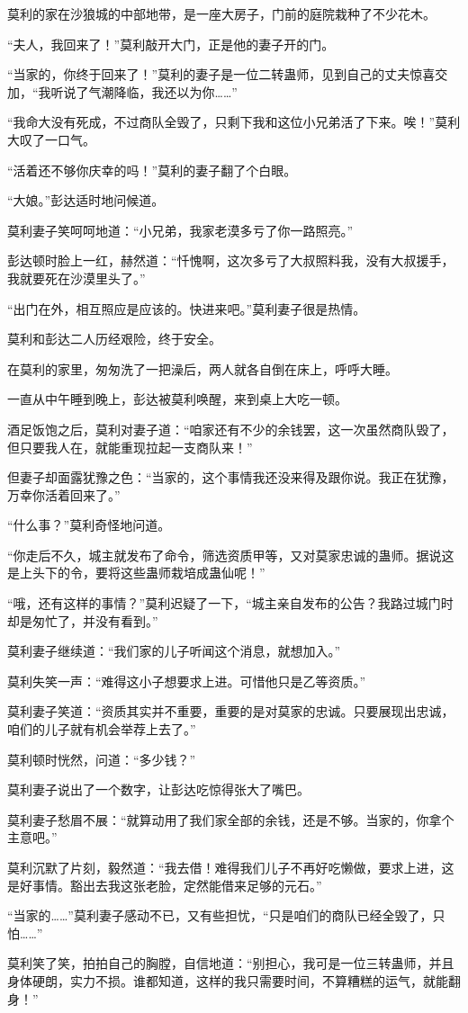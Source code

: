 \begin{this_body}
莫利的家在沙狼城的中部地带，是一座大房子，门前的庭院栽种了不少花木。

“夫人，我回来了！”莫利敲开大门，正是他的妻子开的门。

“当家的，你终于回来了！”莫利的妻子是一位二转蛊师，见到自己的丈夫惊喜交加，“我听说了气潮降临，我还以为你……”

“我命大没有死成，不过商队全毁了，只剩下我和这位小兄弟活了下来。唉！”莫利大叹了一口气。

“活着还不够你庆幸的吗！”莫利的妻子翻了个白眼。

“大娘。”彭达适时地问候道。

莫利妻子笑呵呵地道：“小兄弟，我家老漠多亏了你一路照亮。”

彭达顿时脸上一红，赫然道：“忏愧啊，这次多亏了大叔照料我，没有大叔援手，我就要死在沙漠里头了。”

“出门在外，相互照应是应该的。快进来吧。”莫利妻子很是热情。

莫利和彭达二人历经艰险，终于安全。

在莫利的家里，匆匆洗了一把澡后，两人就各自倒在床上，呼呼大睡。

一直从中午睡到晚上，彭达被莫利唤醒，来到桌上大吃一顿。

酒足饭饱之后，莫利对妻子道：“咱家还有不少的余钱罢，这一次虽然商队毁了，但只要我人在，就能重现拉起一支商队来！”

但妻子却面露犹豫之色：“当家的，这个事情我还没来得及跟你说。我正在犹豫，万幸你活着回来了。”

“什么事？”莫利奇怪地问道。

“你走后不久，城主就发布了命令，筛选资质甲等，又对莫家忠诚的蛊师。据说这是上头下的令，要将这些蛊师栽培成蛊仙呢！”

“哦，还有这样的事情？”莫利迟疑了一下，“城主亲自发布的公告？我路过城门时却是匆忙了，并没有看到。”

莫利妻子继续道：“我们家的儿子听闻这个消息，就想加入。”

莫利失笑一声：“难得这小子想要求上进。可惜他只是乙等资质。”

莫利妻子笑道：“资质其实并不重要，重要的是对莫家的忠诚。只要展现出忠诚，咱们的儿子就有机会举荐上去了。”

莫利顿时恍然，问道：“多少钱？”

莫利妻子说出了一个数字，让彭达吃惊得张大了嘴巴。

莫利妻子愁眉不展：“就算动用了我们家全部的余钱，还是不够。当家的，你拿个主意吧。”

莫利沉默了片刻，毅然道：“我去借！难得我们儿子不再好吃懒做，要求上进，这是好事情。豁出去我这张老脸，定然能借来足够的元石。”

“当家的……”莫利妻子感动不已，又有些担忧，“只是咱们的商队已经全毁了，只怕……”

莫利笑了笑，拍拍自己的胸膛，自信地道：“别担心，我可是一位三转蛊师，并且身体硬朗，实力不损。谁都知道，这样的我只需要时间，不算糟糕的运气，就能翻身！”

\end{this_body}

